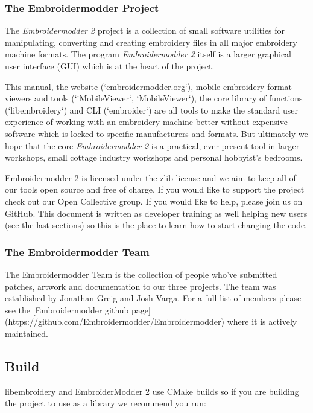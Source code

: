 \documentclass[a4paper, 11pt]{report}
\begin{document}
\subsubsection{The Embroidermodder Project}

The \textit{Embroidermodder 2} project is a collection of small software utilities for
manipulating, converting and creating embroidery files in all major embroidery
machine formats. The program \textit{Embroidermodder 2} itself is a larger graphical
user interface (GUI) which is at the heart of the project.

This manual, the website (`embroidermodder.org`), mobile embroidery format viewers
and tools (`iMobileViewer`, `MobileViewer`), the core library of functions
(`libembroidery`) and CLI (`embroider`) are all tools to make the standard
user experience of working with an embroidery machine better without expensive
software which is locked to specific manufacturers and formats. But ultimately
we hope that the core \textit{Embroidermodder 2} is a practical, ever-present tool in
larger workshops, small cottage industry workshops and personal hobbyist's
bedrooms.

Embroidermodder 2 is licensed under the zlib license and we aim to keep all of
our tools open source and free of charge. If you would like to support the
project check out our Open Collective group. If you would like to help, please
join us on GitHub. This document is written as developer training as well
helping new users (see the last sections) so this is the place to learn how
to start changing the code.

\subsubsection{The Embroidermodder Team}

The Embroidermodder Team is the collection of people who've submitted
patches, artwork and documentation to our three projects.
The team was established by Jonathan Greig and Josh Varga.
For a full list of members please see the
[Embroidermodder github page](https://github.com/Embroidermodder/Embroidermodder)
where it is actively maintained.

\subsection{Build}

libembroidery and EmbroiderModder 2 use CMake builds
so if you are building the project to use as a library we recommend
you run:
 
\end{document}
